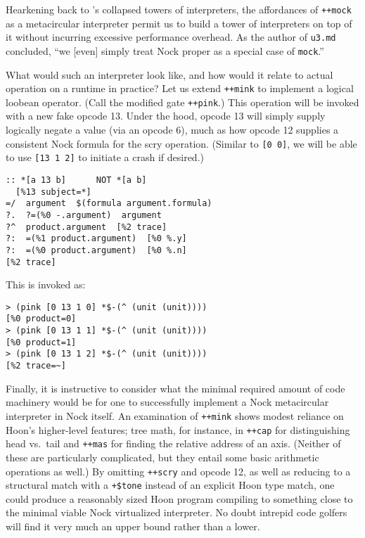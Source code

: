 \documentclass[twoside]{article}
\begin{document}
Hearkening back to \citet{Amin2017}'s collapsed towers of interpreters, the affordances of \lstinline[style=inlinecode]{++mock} as a metacircular interpreter permit us to build a tower of interpreters on top of it without incurring excessive performance overhead.  As the author of \texttt{u3.md} concluded, ``we [even] simply treat Nock proper as a special case of \lstinline[style=inlinecode]{mock}.''

What would such an interpreter look like, and how would it relate to actual operation on a runtime in practice?  Let us extend \lstinline[style=inlinecode]{++mink} to implement a logical loobean operator.  (Call the modified gate \lstinline[style=inlinecode]{++pink}.)  This operation will be invoked with a new fake opcode 13.  Under the hood, opcode 13 will simply supply logically negate a value (via an opcode 6), much as how opcode 12 supplies a consistent Nock formula for the scry operation.  (Similar to \lstinline[style=inlinecode]{[0 0]}, we will be able to use \lstinline[style=inlinecode]{[13 1 2]} to initiate a crash if desired.)

\begin{lstlisting}[style=listingcode]
:: *[a 13 b]      NOT *[a b]
  [%13 subject=*]
=/  argument  $(formula argument.formula)
?.  ?=(%0 -.argument)  argument
?^  product.argument  [%2 trace]
?:  =(%1 product.argument)  [%0 %.y]
?:  =(%0 product.argument)  [%0 %.n]
[%2 trace]
\end{lstlisting}

This is invoked as:

\begin{lstlisting}[style=listingcode]
> (pink [0 13 1 0] *$-(^ (unit (unit))))
[%0 product=0]
> (pink [0 13 1 1] *$-(^ (unit (unit))))
[%0 product=1]
> (pink [0 13 1 2] *$-(^ (unit (unit))))
[%2 trace=~]
\end{lstlisting}

Finally, it is instructive to consider what the minimal required amount of code machinery would be for one to successfully implement a Nock metacircular interpreter in Nock itself.  An examination of \lstinline[style=inlinecode]{++mink} shows modest reliance on Hoon's higher-level features; tree math, for instance, in \lstinline[style=inlinecode]{++cap} for distinguishing head vs.\ tail and \lstinline[style=inlinecode]{++mas} for finding the relative address of an axis.  (Neither of these are particularly complicated, but they entail some basic arithmetic operations as well.)  By omitting \lstinline[style=inlinecode]{++scry} and opcode 12, as well as reducing to a structural match with a \lstinline[style=inlinecode]{+$tone} instead of an explicit Hoon type match, one could produce a reasonably sized Hoon program compiling to something close to the minimal viable Nock virtualized interpreter.  No doubt intrepid code golfers will find it very much an upper bound rather than a lower.
\end{document}
